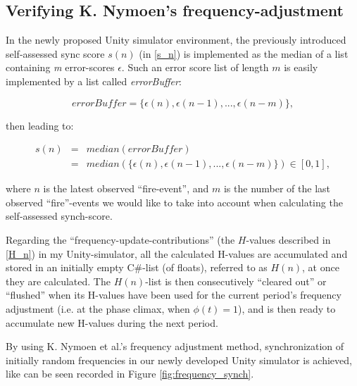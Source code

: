 	
	
	\subsection{Verifying K. Nymoen's frequency-adjustment}
	
	In the newly proposed Unity simulator environment, the previously introduced self-assessed sync score $s(n)$ (in \ref{s_n}) is implemented as the median of a list containing \textit{m} error-scores $\epsilon$. Such an error score list of length $m$ is easily implemented by a list called \textit{errorBuffer}:
	
	\begin{equation}
	\label{error_buffer}
		errorBuffer = \{\epsilon(n), \epsilon(n-1), ... , \epsilon(n-m)\},
	\end{equation} \nl
	
	then leading to:
	
	\begin{equation}
	\label{self_assessed_synch}
		\begin{array}{rrclcl}
		s(n) & = & median(errorBuffer) \\ 
		& = & median(\{\epsilon(n), \epsilon(n-1), ... , \epsilon(n-m)\}) \in [0, 1],
		\end{array}
	\end{equation} \nl
	
	where $n$ is the latest observed ``fire-event'', and $m$ is the number of the last observed ``fire''-events we would like to take into account when calculating the self-assessed synch-score. \nl
	
	Regarding the ``frequency-update-contributions'' (the $H$-values described in \ref{H_n}) in my Unity-simulator, all the calculated H-values are accumulated and stored in an initially empty C\#-list (of floats), referred to as $H(n)$, at once they are calculated. The $H(n)$-list is then consecutively ``cleared out'' or ``flushed'' when its H-values have been used for the current period's frequency adjustment (i.e. at the phase climax, when $\phi(t)=1$), and is then ready to accumulate new H-values during the next period.
	
	By using K. Nymoen et al.'s frequency adjustment method, synchronization of initially random frequencies in our newly developed Unity simulator is achieved, like can be seen recorded in Figure \ref{fig:frequency_synch}.
	
